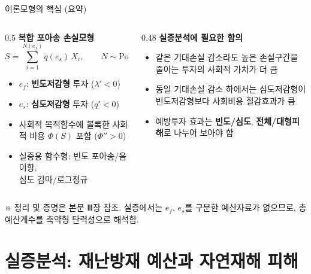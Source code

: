 \documentclass[aspectratio=169,10pt]{beamer}
\newcommand{\src}[1]{\par\vfill{\tiny\color{muted}#1}}
\begin{document}
\begin{frame}{이론모형의 핵심 (요약)}
  \begin{columns}[T]
    \begin{column}{0.5\textwidth}
      \textbf{복합 포아송 손실모형}
      \[
        S = \sum_{i=1}^{N(e_f)} q(e_s)\,X_i,\qquad N \sim \text{Poisson}\big(\lambda(e_f)\big)
      \]
      \small
      \begin{itemize}
        \item $e_f$: \textbf{빈도저감형} 투자 ($\lambda' < 0$)
        \item $e_s$: \textbf{심도저감형} 투자 ($q' < 0$)
        \item 사회적 목적함수에 볼록한 사회적 비용 $\Phi(S)$ 포함 ($\Phi''>0$)
        \item 실증용 함수형: 빈도 포아송/음이항,\\ 심도 감마/로그정규
      \end{itemize}
    \end{column}
    \begin{column}{0.48\textwidth}
      \textbf{실증분석에 필요한 함의}
      \small
      \begin{itemize}
        \item 같은 기대손실 감소라도 \alert{높은 손실구간}을 줄이는 투자의 사회적 가치가 더 큼
        \item 동일 기대손실 감소 하에서는 \alert{심도저감형}이 빈도저감형보다 사회비용 절감효과가 큼
        \item[$\Rightarrow$] 예방투자 효과는 \textbf{빈도/심도}, \textbf{전체/대형피해}로 나누어 보아야 함
      \end{itemize}
    \end{column}
  \end{columns}
  \src{※ 정리 및 증명은 본문 Ⅲ장 참조. 실증에서는 $e_f$, $e_s$를 구분한 예산자료가 없으므로, 총 예산계수를 축약형 탄력성으로 해석함.}
\end{frame}

\section{실증분석: 재난방재 예산과 자연재해 피해}
\end{document}
